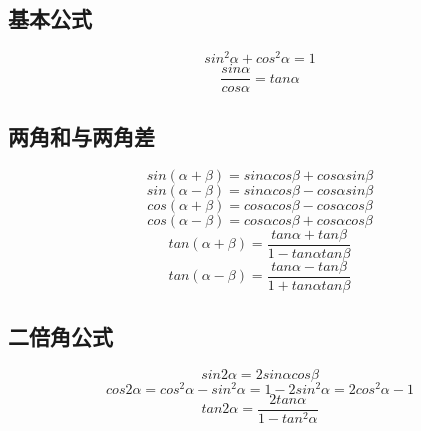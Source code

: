 
\begin{issues}
\issueDraft
\end{issues}

\subsection{基本公式}
\begin{equation}
sin^2\alpha + cos^2\alpha = 1
\end{equation}
\begin{equation}
\frac{sin\alpha}{cos\alpha} = tan\alpha
\end{equation}

\subsection{两角和与两角差}
\begin{equation}
sin(\alpha + \beta) = sin\alpha cos\beta + cos\alpha sin\beta
\end{equation}
\begin{equation}
sin(\alpha - \beta) = sin\alpha cos\beta - cos\alpha sin\beta
\end{equation}
\begin{equation}
cos(\alpha + \beta) = cos\alpha cos\beta - cos\alpha cos\beta
\end{equation}
\begin{equation}
cos(\alpha - \beta) = cos\alpha cos\beta + cos\alpha cos\beta
\end{equation}
\begin{equation}
tan(\alpha + \beta) = \frac{tan\alpha+tan\beta}{1-tan\alpha tan\beta}
\end{equation}
\begin{equation}
tan(\alpha - \beta) = \frac{tan\alpha - tan\beta}{1+tan\alpha tan\beta}
\end{equation}

\subsection{二倍角公式}
\begin{equation}
sin2\alpha = 2sin\alpha cos\beta
\end{equation}
\begin{equation}
cos2\alpha = cos^2\alpha - sin^2\alpha = 1 - 2sin^2\alpha = 2cos^2\alpha -1
\end{equation}
\begin{equation}
tan2\alpha = \frac{2tan\alpha}{1-tan^2\alpha}
\end{equation}

